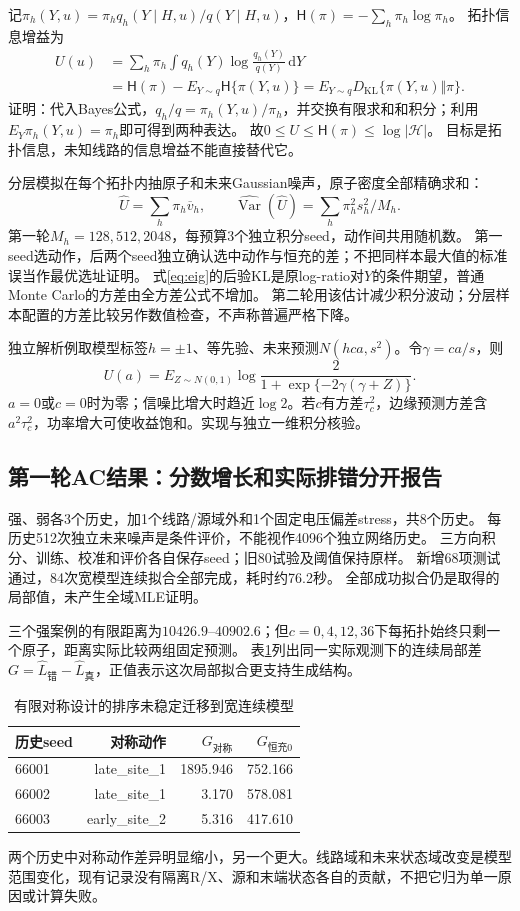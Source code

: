 \documentclass[UTF8,fontset=fandol,11pt,a4paper]{ctexart}
\newcommand{\HH}{\mathcal H}
\newcommand{\KL}{D_{\mathrm{KL}}}
\begin{document}
记$\pi_h(Y,u)=\pi_hq_h(Y\mid H,u)/q(Y\mid H,u)$，$\mathsf H(\pi)=-\sum_h\pi_h\log\pi_h$。
拓扑信息增益为
\begin{align}
 U(u)&=\sum_h\pi_h\int q_h(Y)\log\frac{q_h(Y)}{q(Y)}\,\mathrm dY\\
 &=\mathsf H(\pi)-E_{Y\sim q}\mathsf H\{\pi(Y,u)\}
 =E_{Y\sim q}\KL\{\pi(Y,u)\Vert\pi\}.
 \label{eq:eig}
\end{align}
证明：代入Bayes公式，$q_h/q=\pi_h(Y,u)/\pi_h$，并交换有限求和和积分；利用$E_Y\pi_h(Y,u)=\pi_h$即可得到两种表达。
故$0\le U\le\mathsf H(\pi)\le\log|\HH|$。
目标是拓扑信息，未知线路的信息增益不能直接替代它。

分层模拟在每个拓扑内抽原子和未来Gaussian噪声，原子密度全部精确求和：
\[
 \widehat U=\sum_h\pi_h\overline v_h,
 \qquad \widehat{\operatorname{Var}}(\widehat U)
 =\sum_h\pi_h^2s_h^2/M_h.
\]
第一轮$M_h=128,512,2048$，每预算3个独立积分seed，动作间共用随机数。
第一seed选动作，后两个seed独立确认选中动作与恒充的差；不把同样本最大值的标准误当作最优选址证明。
式\eqref{eq:eig}的后验KL是原log-ratio对$Y$的条件期望，普通Monte Carlo的方差由全方差公式不增加。
第二轮用该估计减少积分波动；分层样本配置的方差比较另作数值检查，不声称普遍严格下降。

独立解析例取模型标签$h=\pm1$、等先验、未来预测$N(hca,s^2)$。令$\gamma=ca/s$，则
\[
 U(a)=E_{Z\sim N(0,1)}
 \log\frac{2}{1+\exp\{-2\gamma(\gamma+Z)\}} .
\]
$a=0$或$c=0$时为零；信噪比增大时趋近$\log2$。若$c$有方差$\tau_c^2$，边缘预测方差含$a^2\tau_c^2$，功率增大可使收益饱和。实现与独立一维积分核验。

\subsection{第一轮AC结果：分数增长和实际排错分开报告}
强、弱各3个历史，加1个线路/源域外和1个固定电压偏差stress，共8个历史。
每历史512次独立未来噪声是条件评价，不能视作4096个独立网络历史。
三方向积分、训练、校准和评价各自保存seed；旧80试验及阈值保持原样。
新增68项测试通过，84次宽模型连续拟合全部完成，耗时约76.2秒。
全部成功拟合仍是取得的局部值，未产生全域MLE证明。

三个强案例的有限距离为$10426.9$--$40902.6$；但$c=0,4,12,36$下每拓扑始终只剩一个原子，距离实际比较两组固定预测。
表\ref{tab:wide}列出同一实际观测下的连续局部差
$G=\widehat L_{\text{错}}-\widehat L_{\text{真}}$，正值表示这次局部拟合更支持生成结构。
\begin{table}[htbp]\centering
\caption{有限对称设计的排序未稳定迁移到宽连续模型}\label{tab:wide}
\begin{tabular}{lrrr}\toprule
历史seed & 对称动作 & $G_{\text{对称}}$ & $G_{\text{恒充0}}$\\\midrule
66001 & late\_site\_1 & 1895.946 & 752.166\\
66002 & late\_site\_1 & 3.170 & 578.081\\
66003 & early\_site\_2 & 5.316 & 417.610\\\bottomrule
\end{tabular}\end{table}
两个历史中对称动作差异明显缩小，另一个更大。线路域和未来状态域改变是模型范围变化，现有记录没有隔离R/X、源和末端状态各自的贡献，不把它归为单一原因或计算失败。
\end{document}
